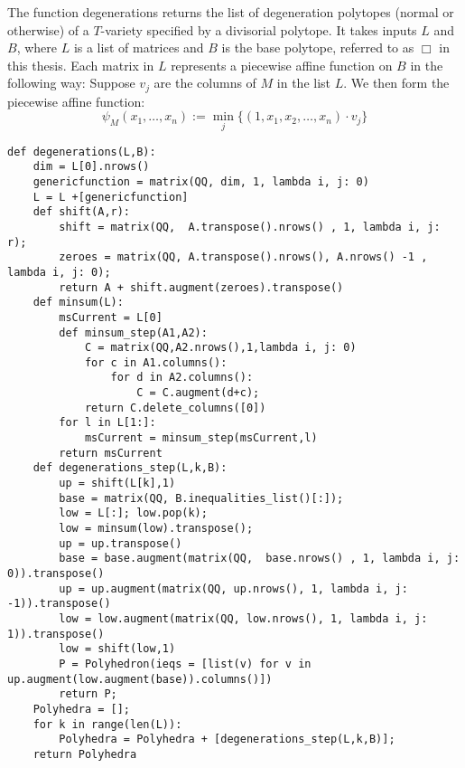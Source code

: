 The function degenerations returns the list of degeneration polytopes (normal or otherwise) of a \(T\)-variety specified by a divisorial polytope. It takes inputs \(L\) and \(B\), where \(L\) is a list of matrices and \(B\) is the base polytope, referred to as \(\Box\) in this thesis. Each matrix in \(L\) represents a piecewise affine function on \(B\) in the following way: Suppose \(v_j\) are the columns of \(M\) in the list \(L\). We then form the piecewise affine function:
\[
\psi_M(x_1,\dots,x_n) := \min_j \{ (1,x_1,x_2,\dots,x_n) \cdot v_j \}
\]
\begin{lstlisting}
def degenerations(L,B):
    dim = L[0].nrows()
    genericfunction = matrix(QQ, dim, 1, lambda i, j: 0)
    L = L +[genericfunction]
    def shift(A,r):
        shift = matrix(QQ,  A.transpose().nrows() , 1, lambda i, j: r);
        zeroes = matrix(QQ, A.transpose().nrows(), A.nrows() -1 , lambda i, j: 0);
        return A + shift.augment(zeroes).transpose()
    def minsum(L):
        msCurrent = L[0]
        def minsum_step(A1,A2):
            C = matrix(QQ,A2.nrows(),1,lambda i, j: 0)
            for c in A1.columns():
                for d in A2.columns():
                    C = C.augment(d+c);
            return C.delete_columns([0])
        for l in L[1:]:
            msCurrent = minsum_step(msCurrent,l)
        return msCurrent
    def degenerations_step(L,k,B):
        up = shift(L[k],1)
        base = matrix(QQ, B.inequalities_list()[:]);
        low = L[:]; low.pop(k);
        low = minsum(low).transpose();
        up = up.transpose()
        base = base.augment(matrix(QQ,  base.nrows() , 1, lambda i, j: 0)).transpose()
        up = up.augment(matrix(QQ, up.nrows(), 1, lambda i, j: -1)).transpose()
        low = low.augment(matrix(QQ, low.nrows(), 1, lambda i, j: 1)).transpose()
        low = shift(low,1)
        P = Polyhedron(ieqs = [list(v) for v in up.augment(low.augment(base)).columns()])
        return P;
    Polyhedra = [];
    for k in range(len(L)):
        Polyhedra = Polyhedra + [degenerations_step(L,k,B)];
    return Polyhedra
\end{lstlisting}
